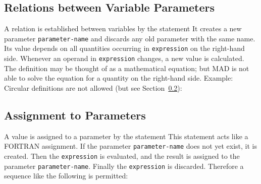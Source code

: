 \subsection{Relations between Variable Parameters}
\label{S-PARAM}
A relation is established between variables by the statement
It creates a new parameter {\tt parameter-name}
and discards any old parameter with the same name.
Its value depends on all quantities occurring
in {\tt expression} on the right-hand side.
Whenever an operand in {\tt expression} changes,
a new value is calculated.
The definition may be thought of as a mathematical equation;
but MAD is not able to solve the equation for a quantity on the
right-hand side.
Example:
Circular definitions are not allowed (but see Section~\ref{S-SET}):
 
\subsection{Assignment to Parameters}
\label{S-SET}
A value is assigned to a parameter by the  statement
This statement acts like a FORTRAN assignment.
If the parameter {\tt parameter-name} does not yet exist,
it is created.
Then the {\tt expression} is evaluated,
and the result is assigned to the parameter {\tt parameter-name}.
Finally the {\tt expression} is discarded.
Therefore a sequence like the following is permitted:
 
